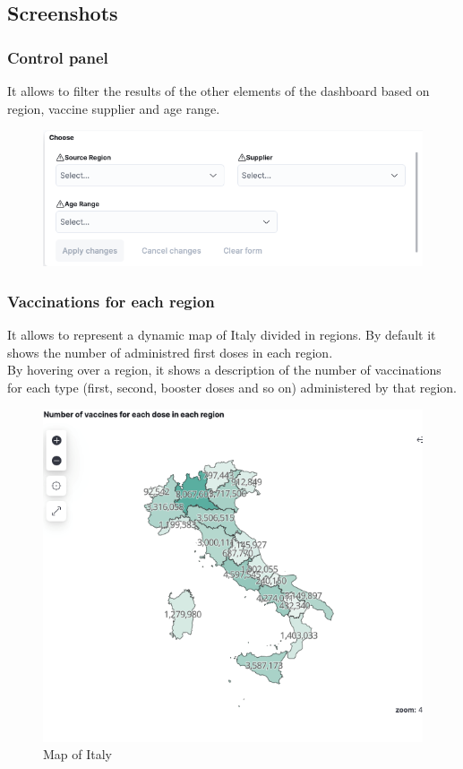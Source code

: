\documentclass[12pt, a4paper]{article}
\begin{document}
\subsection{Screenshots}
\subsubsection{Control panel}
It allows to filter the results of the other elements of the dashboard based on region,
vaccine supplier and age range.
\begin{figure}[ht]
  \centering
  \includegraphics[width=.9\linewidth]{img (2).png}
\end{figure}

\subsubsection{Vaccinations for each region}
It allows to represent a dynamic map of Italy divided in regions. By default it shows the
number of administred first doses in each region. \\ 
By hovering over a region, it shows a description of the number of vaccinations for each
type (first, second, booster doses and so on) administered by that region.

\begin{figure}[H]
  \centering
  \includegraphics[width=.8\linewidth]{img (4).png}
  \caption*{Map of Italy}
\end{figure}
\end{document}
